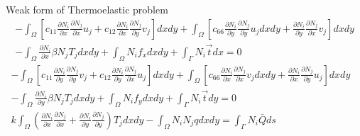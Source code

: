 \documentclass{beamer}
\begin{document}
\begin{frame}[t,fragile]{Weak form of Thermoelastic problem}
            \tiny
        \begin{align*}
     -\int_{\Omega}^{}\left[ c_{11}\frac{\partial N_i}{\partial x}\frac{\partial N_j}{\partial x}u_j+c_{12}\frac{\partial N_i}{\partial x}\frac{\partial N_j}{\partial y}v_j\right]dxdy+\int_{\Omega}^{}\left[c_{66}\frac{\partial N_i}{\partial y}\frac{\partial N_j}{\partial y}u_jdxdy+\frac{\partial N_i}{\partial y}\frac{\partial N_j}{\partial x}v_j\right]dxdy\nonumber\\ -\int_{\Omega}^{}\frac{\partial N_i}{\partial x}\beta N_jT_j dxdy +\int_{\Omega}^{}N_if_x
     dxdy+\int_{\Gamma}^{}N_i\vec{t}dx=0\end{align*}
 \begin{align*}
     -\int_{\Omega}^{}\left[ c_{11}\frac{\partial N_i}{\partial y}\frac{\partial N_j}{\partial y}v_j+c_{12}\frac{\partial N_i}{\partial y}\frac{\partial N_j}{\partial x}u_j\right]dxdy+\int_{\Omega}^{}\left[c_{66}\frac{\partial N_i}{\partial x}\frac{\partial N_j}{\partial x}v_jdxdy+\frac{\partial N_i}{\partial x}\frac{\partial N_j}{\partial y}u_j\right]dxdy\nonumber\\ -\int_{\Omega}^{}\frac{\partial N_i}{\partial y}\beta N_jT_j dxdy+\int_{\Omega}^{}N_if_y dxdy+\int_{\Gamma}^{}N_i\vec{t}dy=0\\
        k\int_{\Omega}\left( \frac{\partial N_i}{\partial x}\frac{\partial N_j}{\partial x}+\frac{\partial N_i}{\partial y}\frac{\partial N_j}{\partial y} \right)T_jdxdy-\int_{\Omega}^{}N_iN_jqdxdy=\int_{\Gamma}^{}N_i\bar{Q}ds& \end{align*}
\end{frame}
\end{document}
